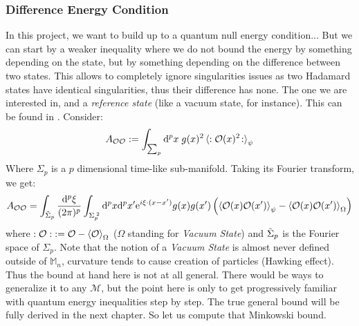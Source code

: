 \documentclass[a4paper,11pt]{article}
\numberwithin{equation}{section}
\theoremstyle{definition}
\renewcommand{\d}{{\mathrm{d}}}
\newcommand{\e}{{\mathrm{e}}}
\begin{document}
\subsubsection{Difference Energy Condition}
In this project, we want to build up to a quantum null energy condition... But we can start by a weaker inequality where we do not bound the energy by something depending on the state, but by something depending on the difference between two states. This allows to completely ignore singularities issues as two Hadamard states have identical singularities, thus their difference has none. The one we are interested in, and a \emph{reference state} (like a vacuum state, for instance). This can be found in \cite{DSNEC}.
Consider:
\begin{equation}
    A_{\mathcal{O}\mathcal{O}}:=\int_{\sum_p}\d^px\; g(x)^2\braket{:\mathcal{O}(x)^2\!:}_\psi
\end{equation}
Where $\Sigma_p$ is a $p$ dimensional time-like sub-manifold. Taking its Fourier transform, we get:
\begin{equation}
    A_{\mathcal{O}\mathcal{O}}=\int_{\Tilde{\Sigma}_p}\frac{\d^p\xi}{(2\pi)^p}\int_{\Sigma_p^{\;2}}\d^px\d^px'\e^{i\xi\cdot(x-x')}g(x)g(x')\left(\braket{\mathcal{O}(x)\mathcal{O}(x')}_\psi-\braket{\mathcal{O}(x)\mathcal{O}(x')}_\Omega\right)
\end{equation}
where $:\mathcal{O}: \; := \mathcal{O}-\braket{\mathcal{O}}_\Omega$ ($\Omega$ standing for \emph{Vacuum State}) and $\Tilde{\Sigma}_p$ is the Fourier space of $\Sigma_p$. Note that the notion of a \emph{Vacuum State} is almost never defined outside of $\mathbb{M}_n$, curvature tends to cause creation of particles (Hawking effect). Thus the bound at hand here is not at all general. There would be ways to generalize it to any $\mathcal{M}$, but the point here is only to get progressively familiar with quantum energy inequalities step by step. The true general bound will be fully derived in the next chapter. So let us compute that Minkowski bound.
\end{document}
